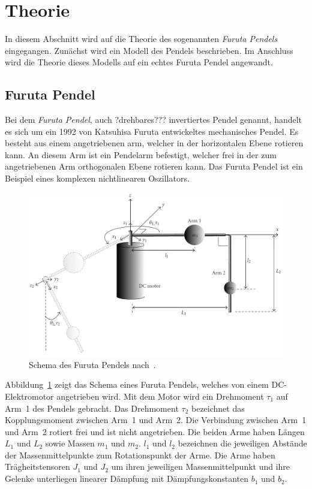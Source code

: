 \section{Theorie}
\label{sec.Theorie}
In diesem Abschnitt wird auf die Theorie des sogenannten \emph{Furuta Pendels} eingegangen. Zunächst wird ein Modell des Pendels beschrieben. Im Anschluss wird die Theorie dieses Modells auf ein echtes Furuta Pendel angewandt. %

\subsection{Furuta Pendel}
\label{sub.Furuta-Pendel}
Bei dem \emph{Furuta Pendel}, auch ?drehbares??? invertiertes Pendel genannt, handelt es sich um ein 1992 von Katsuhisa Furuta entwickeltes mechanisches Pendel. 
Es besteht aus einem angetriebenen arm, welcher in der horizontalen Ebene rotieren kann. 
An diesem Arm ist ein Pendelarm befestigt, welcher frei in der zum angetriebenen Arm orthogonalen Ebene rotieren kann. 
Das Furuta Pendel ist ein Beispiel eines komplexen nichtlinearen Oszillators. \citet{Cazzolato.2011}


\begin{figure}[htbp]
	\label{fig.furuta-schematic}
	\centering
	\includegraphics[width=1.\textwidth]{Grafiken/furuta3.jpg}
	\caption{Schema des Furuta Pendels nach~\cite{Cazzolato.2011}. }
\end{figure}

Abbildung~\ref{fig.furuta-schematic} zeigt das Schema eines Furuta Pendels, welches von einem DC-Elektromotor angetrieben wird.
Mit dem Motor wird ein Drehmoment $\tau_1$ auf Arm~1 des Pendels gebracht. %
Das Drehmoment $\tau_2$ bezeichnet das Kopplungsmoment zwischen Arm~1 und Arm~2. %
Die Verbindung zwischen Arm~1 und Arm~2 rotiert frei und ist nicht angetrieben.
Die beiden Arme haben Längen $L_1$ und $L_2$ sowie Massen $m_1$ und $m_2$.
$l_1$ und $l_2$ bezeichnen die jeweiligen Abstände der Massenmittelpunkte zum Rotationspunkt der Arme.
Die Arme haben Trägheitstensoren $J_1$ und $J_2$ um ihren jeweiligen Massenmittelpunkt und ihre Gelenke unterliegen linearer Dämpfung mit Dämpfungskonstanten $b_1$ und $b_2$.

